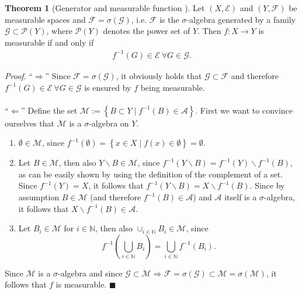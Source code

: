 \documentclass[12pt, a4paper]{article}
\numberwithin{equation}{section}
\theoremstyle{definition}
\theoremstyle{definition}
\newtheorem{theorem}[thm]{Theorem}
\begin{document}
	\begin{theorem}[Generator and measurable function \cite{measurable-functions}] \label{generator-and-measurable-function} Let $(X, \mathcal E)$ and $(Y, \mathcal F)$ be measurable spaces and $\mathcal F = \sigma(\mathcal G)$, i.e. $\mathcal F$ is the $\sigma$-algebra generated by a family $\mathcal G \subset \mathcal P(Y)$, where $\mathcal P(Y)$ denotes the power set of $Y$. Then $f: X\rightarrow Y$ is measurable if and only if 
		\begin{align}
			f^{-1}\left(G\right) \in \mathcal E \ \forall G\in\mathcal G. 
		\end{align}
	\end{theorem}
	\noindent \textit{Proof}. \enquote{$\Rightarrow$} Since $\mathcal F = \sigma(\mathcal G)$, it obviously holds that $\mathcal G\subset \mathcal F$ and therefore $f^{-1}(G)\in \mathcal E \ \forall G\in\mathcal G$ is ensured by $f$ being measurable. 
	\\ \\ 
	\enquote{$\Leftarrow$} Define the set $\mathcal M:= \left\{ B\subset Y \mid f^{-1}(B)\in \mathcal A \right\}$. First we want to convince ourselves that $\mathcal M$ is a $\sigma$-algebra on $Y$. 
	\begin{enumerate}
		\item $\emptyset \in \mathcal M$, since $f^{-1}(\emptyset) = \left\{ x\in X \mid f(x)\in \emptyset \right\} = \emptyset$. 
		
		\item Let $B\in \mathcal M$, then also $Y\backslash B\in \mathcal M$, since $f^{-1}\left(Y\backslash B\right) = f^{-1}(Y)\backslash f^{-1}(B)$, as can be easily shown by using the definition of the complement of a set. Since $f^{-1}(Y) = X$, it follows that $f^{-1}(Y\backslash B) = X\backslash f^{-1}(B)$. Since by assumption $B\in \mathcal M$ (and therefore $f^{-1}(B)\in \mathcal A$) and $\mathcal A$ itself is a $\sigma$-algebra, it follows that $X\backslash f^{-1}(B)\in\mathcal A$. 
		
		\item  Let $B_i \in \mathcal M$ for $i\in \mathbb N$, then also $\cup_{i\in\mathbb N}B_i\in \mathcal M$, since $$f^{-1}\left(\bigcup_{i\in\mathbb N}B_i\right) = \bigcup_{i\in\mathbb N}f^{-1}\left(B_i\right).$$ 
	\end{enumerate}
	Since $\mathcal M$ is a $\sigma$-algebra and since $\mathcal G\subset \mathcal M \Rightarrow \mathcal F = \sigma(\mathcal G)\subset \mathcal M = \sigma(\mathcal M) $, it follows that $f$ is measurable. 
	 \newline \qquad\qquad\qquad\qquad\qquad\qquad\qquad\qquad\qquad\qquad\qquad\qquad\qquad\qquad\qquad\qquad\qquad\qquad\qquad\qquad\quad$\blacksquare$
\end{document}
